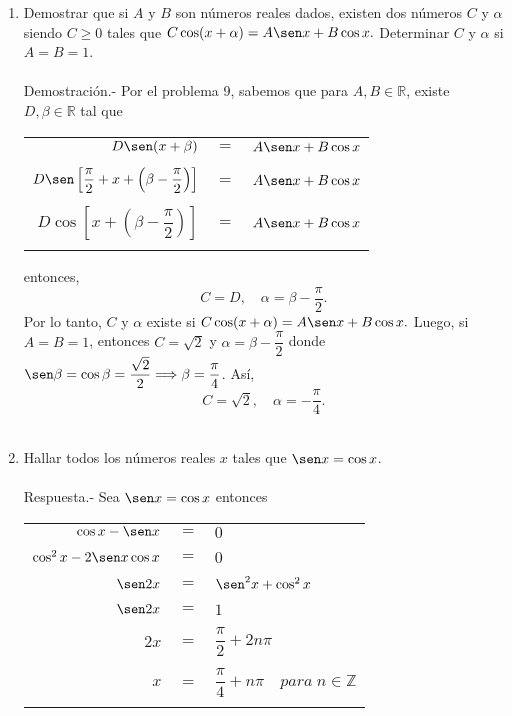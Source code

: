 \begin{enumerate}[\bfseries 1.]
\item Demostrar que si $A$ y $B$ son números reales dados, existen dos números $C$  y $\alpha$ siendo $C\geq 0$ tales que $C \cos(x+\alpha) = A \sen x + B\cos x.$ Determinar $C$ y $\alpha$ si $A=B=1$.\\\\
    Demostración.-\; Por el problema 9, sabemos que para $A,B \in \mathbb{R}$, existe $D, \beta \in \mathbb{R}$ tal que 
    \begin{center}
	\begin{tabular}{rcl}
	    $D\sen (x+\beta)$&$=$&$A\sen x + B \cos x$\\\\
	    $D \sen \left[\dfrac{\pi}{2} + x + \left(\beta - \dfrac{\pi}{2}\right)\right]$&$=$&$A \sen x +B \cos x$\\\\
	    $D\cos \left[x + \left(\beta - \dfrac{\pi}{2}\right)\right]$&$=$&$A\sen x + B \cos x$\\\\
	\end{tabular}
    \end{center}
    entonces, $$C=D, \quad \alpha = \beta -\dfrac{\pi}{2}.$$
    Por lo tanto, $C$ y $\alpha$ existe si $C\cos(x+\alpha) = A \sen x + B\cos x.$
    Luego, si $A=B=1$, entonces $C=\sqrt{2}$ y $\alpha = \beta - \dfrac{\pi}{2}$ donde $\sen \beta = \cos \beta = \dfrac{\sqrt{2}}{2} \Longrightarrow \beta = \dfrac{\pi}{4}$. Así,
    $$C = \sqrt{2}, \quad \alpha = - \dfrac{\pi}{4}.$$\\

\item Hallar todos los números reales $x$ tales que $\sen x = \cos x$.\\\\
    Respuesta.-\; Sea $\sen x = \cos x$ entonces 
    \begin{center}
	\begin{tabular}{rcl}
	    $\cos x - \sen x$& $=$ & $0$\\\\
			    $\cos^2 x - 2\sen x\cos x$&$=$&$0$\\\\
			    $\sen 2 x$&$=$&$\sen^2x + \cos^2 x$\\\\
			    $\sen 2x$&$=$&$1$\\\\
			    $2x$&$=$&$\dfrac{\pi}{2}+2n\pi$\\\\
			    $x$&$=$&$\dfrac{\pi}{4} + n\pi \quad para\; n \in \mathbb{Z}$\\\\
	\end{tabular}
    \end{center}


\end{enumerate}
